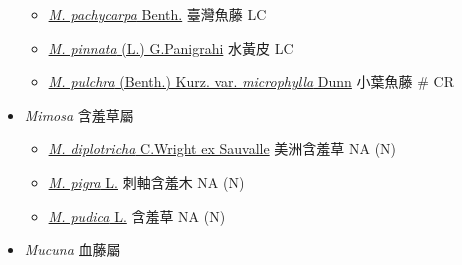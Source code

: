 \begin{itemize}
  \begin{itemize}
        \item[] \href{http://www.theplantlist.org/tpl1.1/search?q=Millettia+pachycarpa}{\textit{M. pachycarpa} Benth.}   臺灣魚藤   LC
        \item[] \href{http://www.theplantlist.org/tpl1.1/search?q=Millettia+pinnata}{\textit{M. pinnata} (L.) G.Panigrahi}   水黃皮   LC
        \item[] \href{http://www.theplantlist.org/tpl1.1/search?q=Millettia+pulchra+var.+microphylla}{\textit{M. pulchra} (Benth.) Kurz. var. \textit{microphylla} Dunn}   小葉魚藤  \# CR
  \end{itemize}
 \item[] \textit{Mimosa} 含羞草屬
                                
  \begin{itemize}
        \item[] \href{http://www.theplantlist.org/tpl1.1/search?q=Mimosa+diplotricha}{\textit{M. diplotricha} C.Wright ex Sauvalle}   美洲含羞草   NA (N)
        \item[] \href{http://www.theplantlist.org/tpl1.1/search?q=Mimosa+pigra}{\textit{M. pigra} L.}   刺軸含羞木   NA (N)
        \item[] \href{http://www.theplantlist.org/tpl1.1/search?q=Mimosa+pudica}{\textit{M. pudica} L.}   含羞草   NA (N)
  \end{itemize}
 \item[] \textit{Mucuna} 血藤屬
                                

\end{itemize}
